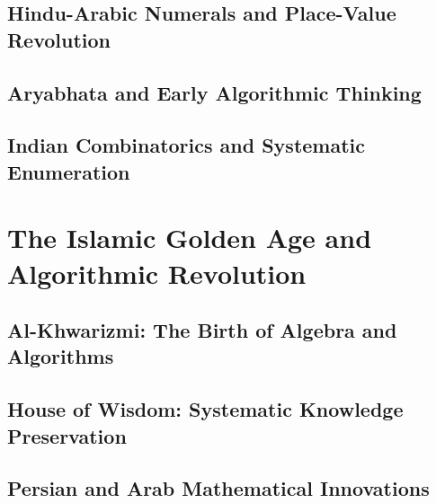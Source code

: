 \documentclass[12pt, oneside, openany]{book}
\begin{document}
\section{Hindu-Arabic Numerals and Place-Value Revolution}

\section{Aryabhata and Early Algorithmic Thinking}

\section{Indian Combinatorics and Systematic Enumeration}


\chapter{The Islamic Golden Age and Algorithmic Revolution}

\section{Al-Khwarizmi: The Birth of Algebra and Algorithms}

\section{House of Wisdom: Systematic Knowledge Preservation}

\section{Persian and Arab Mathematical Innovations}
\end{document}
